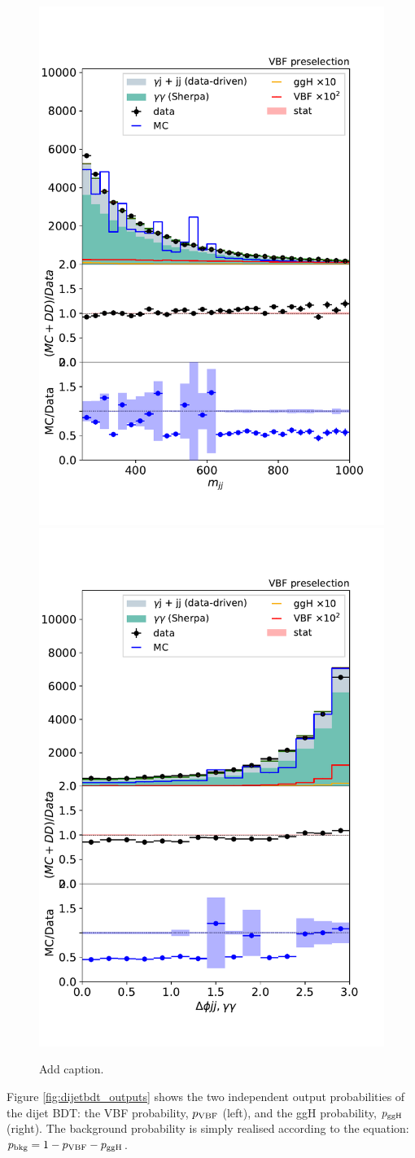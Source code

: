 \begin{figure}[hptb]
  \centering
  \includegraphics[width=.49\textwidth]{Figures/hgg_overview/DijetBDT_input_Mjj.pdf}
  \includegraphics[width=.49\textwidth]{Figures/hgg_overview/DijetBDT_input_dPhi.pdf}
  \caption[Dijet BDT input features using the data-driven background estimate]
  {
    Add caption.
  }
  \label{fig:dijetbdt_validation}
\end{figure}

Figure \ref{fig:dijetbdt_outputs} shows the two independent output probabilities of the dijet BDT: the VBF probability, $p_{\rm{VBF}}$ (left), and the ggH probability, $p_{\rm{ggH}}$ (right). The background probability is simply realised according to the equation: $p_{\rm{bkg}}=1-p_{\rm{VBF}}-p_{\rm{ggH}}$. 

